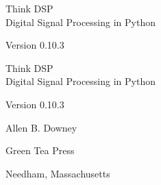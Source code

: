 \documentclass[12pt]{book}
\newcommand{\theversion}{0.10.3}
\begin{document}
\begin{latexonly}

\renewcommand{\blankpage}{\thispagestyle{empty} \quad \newpage}


\thispagestyle{empty}

\begin{flushright}
\vspace*{2.0in}

\begin{spacing}{3}
{\huge Think DSP}\\
{\Large Digital Signal Processing in Python}
\end{spacing}

\vspace{0.25in}

Version \theversion

\vfill

\end{flushright}


\blankpage
\blankpage

\pagebreak
\thispagestyle{empty}

\begin{flushright}
\vspace*{2.0in}

\begin{spacing}{3}
{\huge Think DSP}\\
{\Large Digital Signal Processing in Python}
\end{spacing}

\vspace{0.25in}

Version \theversion

\vspace{1in}


{\Large
Allen B. Downey\\
}


\vspace{0.5in}

{\Large Green Tea Press}

{\small Needham, Massachusetts}

\vfill

\end{flushright}


\pagebreak
\thispagestyle{empty}


\end{latexonly}
\end{document}
